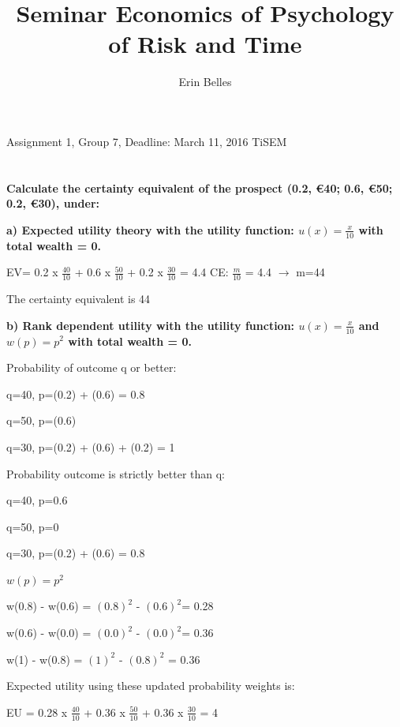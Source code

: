 \documentclass{article}
\title{Seminar Economics of Psychology of Risk and Time}
\author{Erin Belles}
\begin{document}
	
\maketitle 
 Assignment 1, Group 7, Deadline: March 11, 2016 TiSEM 

\section{}
\textbf{ Calculate the certainty equivalent of the prospect (0.2, €40; 0.6, €50; 0.2, €30), under: } 

\vspace{4mm}

\textbf{ a) Expected utility theory with the utility function: 
$u(x) = \frac{x}{10}$ 
	with total wealth = 0.} 

	\vspace{2mm}
		EV=	0.2	x $\frac{40}{10}$ +	0.6	x $\frac{50}{10}$ + 0.2 x $\frac{30}{10}$ =	4.4
	CE:	$\frac{m}{10}$ = 4.4 $\rightarrow$ m=44 
	
	The	certainty equivalent is	44
	\vspace{4mm}
	
	\textbf{ b) Rank dependent utility with the utility function:
$u(x) = \frac{x}{10}$ and $w(p) = p^{2}$
	 with total wealth = 0.}   

\vspace{2mm}
Probability	of	outcome	q	or	better:

q=40,	p=(0.2)	 +	(0.6)	=	0.8

q=50,	p=(0.6)

q=30,	p=(0.2)	 +	(0.6)	+ (0.2)	=	1

\vspace {2mm}

Probability	outcome	is	strictly	better	than q:


q=40,	p=0.6

q=50,	p=0

q=30,	p=(0.2)	+	(0.6)	=	0.8

$w(p)=p^2$

w(0.8)	-	 w(0.6)	=	$(0.8)^2$ - $(0.6)^2$=	0.28

w(0.6)	-	 w(0.0)	=	$(0.0)^2$ - $(0.0)^2$=	0.36

w(1)	-	 w(0.8)	=	$(1)^2$ - $(0.8)^2$ =	0.36

\vspace {2mm}

Expected	utility	using	these	updated	probability	weights	is:

EU	=	0.28	x	$\frac{40}{10}$	 +	0.36 x	$\frac{50}{10}$	+	0.36 x $\frac{30}{10}$	=	4
\end{document}
